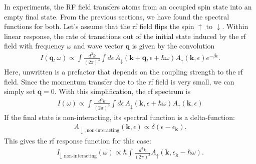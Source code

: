 \documentclass{article}
\theoremstyle{definition}
\newcommand{\be}{\beta}
\newcommand{\f}[2]{\frac{#1}{#2}}
\begin{document}
In experiments, the RF field transfers atoms from an occupied spin state into an empty final state. From the previous sections, we have found the spectral functions for both. Let's assume that the rf field flips the spin $\uparrow$ to $\downarrow$. Within linear response, the rate of transitions out of the initial state induced by the rf field with frequency $\omega$ and wave vector $\mathbf{q}$ is given by the convolution 
\begin{align}
I(\mathbf{q}, \omega)
\propto 
\int \f{d^3 k}{(2\pi)^3} \int d\epsilon \, A_\downarrow(\mathbf{k} + \mathbf{q}, \epsilon + \hbar \omega) A_\uparrow(\mathbf{k}, \epsilon) e^{-\be \epsilon}.
\end{align}
Here, unwritten is a prefactor that depends on the coupling strength to the rf field. Since the momentum transfer due to the rf field is very small, we can simply set $\mathbf{q} = 0$. With this simplification, the rf spectrum is 
\begin{align}
I(\omega) 
\propto
\int \f{d^3k}{(2\pi)^3} 
\int d\epsilon \, A_\downarrow(\mathbf{k}, \epsilon + \hbar \omega) A_\uparrow(\mathbf{k}, \epsilon)
\end{align}
If the final state is non-interacting, its spectral function is a delta-function:
\begin{align}
A_{\downarrow, \text{non-interacting}} (\mathbf{k},\epsilon) 
\propto
\delta(\epsilon - \epsilon_\mathbf{k}).
\end{align}
This gives the rf response function for this case:
\begin{align}
I_{\downarrow \text{ non-interacting}}(\omega) \propto 
\hbar \int \f{d^3k}{(2\pi)^3}  A_\uparrow(\mathbf{k}, \epsilon_\mathbf{k} - \hbar \omega).
\end{align}





 
	
\end{document}
